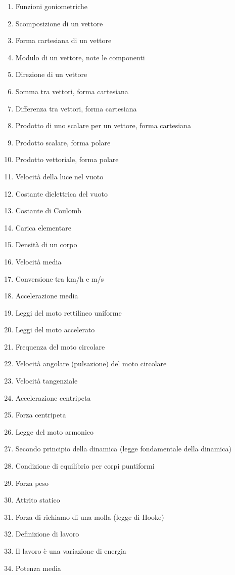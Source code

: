 \documentclass[a4paper,11pt,italian]{article}
\begin{document}
\begin{enumerate}
\item Funzioni goniometriche
\item Scomposizione di un vettore
\item Forma cartesiana di un vettore
\item Modulo di un vettore, note le componenti
\item Direzione di un vettore 
\item Somma tra vettori, forma cartesiana
\item Differenza tra vettori, forma cartesiana
\item Prodotto di uno scalare per un vettore, forma cartesiana
\item Prodotto scalare, forma polare
\item Prodotto vettoriale, forma polare
\item Velocità della luce nel vuoto
\item Costante dielettrica del vuoto
\item Costante di Coulomb
\item Carica elementare
\item Densità di un corpo
\item Velocità media
\item Conversione tra km/h e m/s
\item Accelerazione media
\item Leggi del moto rettilineo uniforme
\item Leggi del moto accelerato
\item Frequenza del moto circolare
\item Velocità angolare (pulsazione) del moto circolare
\item Velocità tangenziale
\item Accelerazione centripeta
\item Forza centripeta
\item Legge del moto armonico 
\item Secondo principio della dinamica (legge fondamentale della dinamica)
\item Condizione di equilibrio per corpi puntiformi
\item Forza peso
\item Attrito statico
\item Forza di richiamo di una molla (legge di Hooke)
\item Definizione di lavoro
\item Il lavoro è una variazione di energia
\item Potenza media

\end{enumerate}
\end{document}
